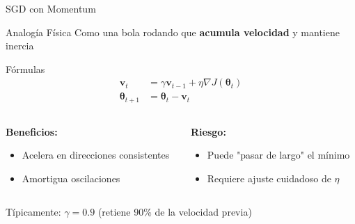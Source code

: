 \documentclass[10pt]{beamer}
\begin{document}
\begin{frame}{SGD con Momentum}
\begin{block}{Analogía Física}
Como una bola rodando que \textbf{acumula velocidad} y mantiene inercia
\end{block}

\begin{block}{Fórmulas}
\begin{align}
\mathbf{v}_t &= \gamma \mathbf{v}_{t-1} + \eta \nabla J(\boldsymbol{\theta}_t) \\
\boldsymbol{\theta}_{t+1} &= \boldsymbol{\theta}_t - \mathbf{v}_t
\end{align}
\end{block}

\begin{columns}
\begin{column}{0.5\textwidth}
\textbf{Beneficios:}
\begin{itemize}
\item Acelera en direcciones consistentes
\item Amortigua oscilaciones
\end{itemize}
\end{column}
\begin{column}{0.5\textwidth}
\textbf{Riesgo:}
\begin{itemize}
\item Puede "pasar de largo" el mínimo
\item Requiere ajuste cuidadoso de $\eta$
\end{itemize}
\end{column}
\end{columns}

\vspace{0.3cm}
Típicamente: $\gamma = 0.9$ (retiene 90\% de la velocidad previa)
\end{frame}
\end{document}
